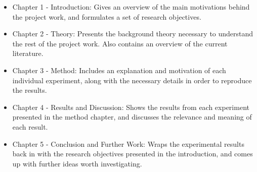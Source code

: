 \begin{itemize}
    \item Chapter 1 - Introduction: Gives an overview of the main motivations behind the project work, and formulates a set of research objectives.
    \item Chapter 2 - Theory: Presents the background theory necessary to understand the rest of the project work. Also contains an overview of the current literature.
    \item Chapter 3 - Method: Includes an explanation and motivation of each individual experiment, along with the necessary details in order to reproduce the results.
    \item Chapter 4 - Results and Discussion: Shows the results from each experiment presented in the method chapter, and discusses the relevance and meaning of each result.
    \item Chapter 5 - Conclusion and Further Work: Wraps the experimental results back in with the research objectives presented in the introduction, and comes up with further ideas worth investigating.
\end{itemize}



